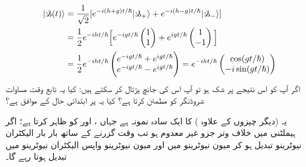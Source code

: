 \begin{align*}
| \s (t) \rangle &= \frac{1}{\sqrt{2}} [ e^{-i(h+g)t/\hslash} | \s_{+} \rangle + e^{-i(h-g)t/\hslash} | \s_{-} \rangle ] \\
&= \frac{1}{2} e^{-iht/\hslash} \Big[ e^{-igt/\hslash} \begin{pmatrix} 1 \\ 1 \end{pmatrix} + e^{igt/\hslash} \begin{pmatrix} 1 \\ -1 \end{pmatrix} \Big] \\
&= \frac{1}{2} e^{-iht/\hslash} \begin{pmatrix} e^{-igt/\hslash} + e^{igt/\hslash} \\ e^{-igt/\hslash} - e^{igt/\hslash} \end{pmatrix} = e^{-iht/\hslash} \begin{pmatrix} \cos (gt/\hslash) \\ -i\sin (gt/\hslash) \end{pmatrix}
\end{align*}
اگر آپ کو اس نتیجے پر شک ہو تو آپ اس کی جانچ پڑتال کر سکتے ہیں: کیا یہ تابع وقت مساوات شروڈنگر کو مطمئن کرتا ہے؟ کیا یہ  پر ابتدائی حال کے موافق ہے؟ 

یہ (دیگر چیزوں کے علاوہ )  کا ایک سادہ نمونہ ہے جہاں ، اور  کو ظاہر کرتا ہے؛ اگر ہیملٹنی میں خلاف وتر جزو  غیر معدوم ہو تب وقت گزرنے کے ساتھ بار بار الیکٹران نیوٹرینو تبدیل ہو کر میون نیوٹرینو میں اور میون نیوٹرینو واپس الیکٹران نیوٹرینو میں تبدیل ہوتا رہے گا۔


